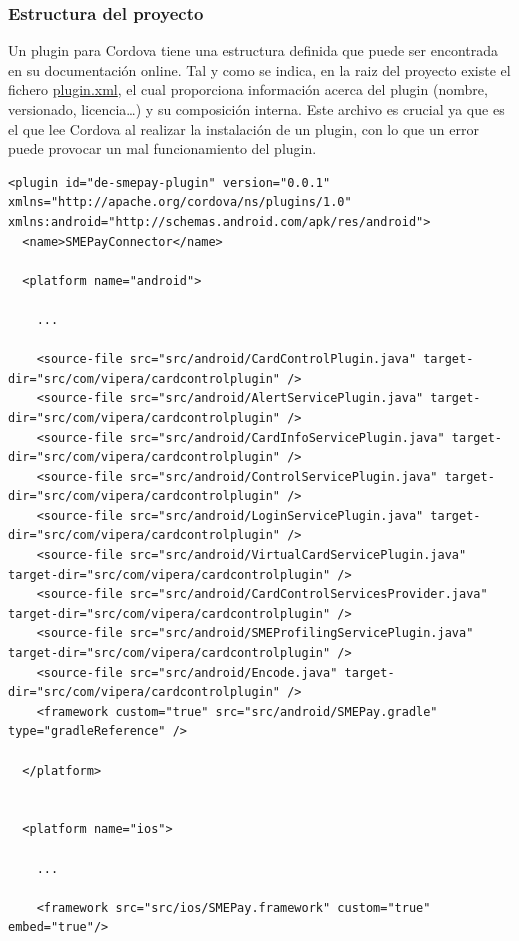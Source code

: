 \documentclass[a4paper, 12pt]{article}
\newenvironment{code}{\captionsetup{type=listing}}{}
\begin{document}
\subsubsection{Estructura del proyecto}
\label{sec-4-3-1}
Un plugin para Cordova tiene una estructura definida que puede ser encontrada en su documentación online\cite{Cordova}. Tal y como se indica, en la raiz del proyecto existe el fichero \hyperref[code:pluginxml]{plugin.xml},
el cual proporciona información acerca del plugin (nombre, versionado, licencia\ldots{}) y su composición interna. Este archivo es crucial ya que es el que lee Cordova al realizar la instalación de un plugin,
con lo que un error puede provocar un mal funcionamiento del plugin.
\begin{code}
\label{code:pluginxml}
\begin{verbatim}
<plugin id="de-smepay-plugin" version="0.0.1" xmlns="http://apache.org/cordova/ns/plugins/1.0" xmlns:android="http://schemas.android.com/apk/res/android">
  <name>SMEPayConnector</name>

  <platform name="android">

    ...

    <source-file src="src/android/CardControlPlugin.java" target-dir="src/com/vipera/cardcontrolplugin" />
    <source-file src="src/android/AlertServicePlugin.java" target-dir="src/com/vipera/cardcontrolplugin" />
    <source-file src="src/android/CardInfoServicePlugin.java" target-dir="src/com/vipera/cardcontrolplugin" />
    <source-file src="src/android/ControlServicePlugin.java" target-dir="src/com/vipera/cardcontrolplugin" />
    <source-file src="src/android/LoginServicePlugin.java" target-dir="src/com/vipera/cardcontrolplugin" />
    <source-file src="src/android/VirtualCardServicePlugin.java" target-dir="src/com/vipera/cardcontrolplugin" />
    <source-file src="src/android/CardControlServicesProvider.java" target-dir="src/com/vipera/cardcontrolplugin" />
    <source-file src="src/android/SMEProfilingServicePlugin.java" target-dir="src/com/vipera/cardcontrolplugin" />
    <source-file src="src/android/Encode.java" target-dir="src/com/vipera/cardcontrolplugin" />
    <framework custom="true" src="src/android/SMEPay.gradle" type="gradleReference" />

  </platform>


  <platform name="ios">

    ...

    <framework src="src/ios/SMEPay.framework" custom="true" embed="true"/>


\end{verbatim}
\end{code}
\end{document}
